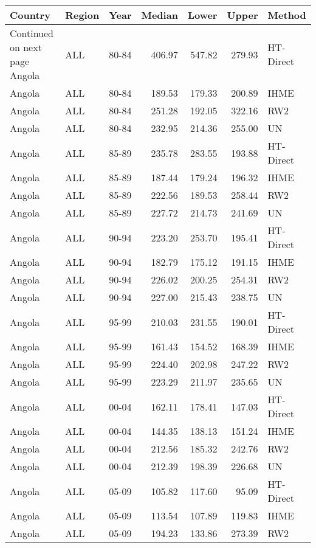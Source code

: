 \begin{longtable}{lllrrrl}
  \hline
Country & Region & Year & Median & Lower & Upper & Method \\ 
  \hline 
\endhead 
\hline 
{\footnotesize Continued on next page} 
\endfoot 
\endlastfoot 
Angola & ALL & 80-84 & 406.97 & 547.82 & 279.93 & HT-Direct \\ 
  Angola & ALL & 80-84 & 189.53 & 179.33 & 200.89 & IHME \\ 
  Angola & ALL & 80-84 & 251.28 & 192.05 & 322.16 & RW2 \\ 
  Angola & ALL & 80-84 & 232.95 & 214.36 & 255.00 & UN \\ 
  Angola & ALL & 85-89 & 235.78 & 283.55 & 193.88 & HT-Direct \\ 
  Angola & ALL & 85-89 & 187.44 & 179.24 & 196.32 & IHME \\ 
  Angola & ALL & 85-89 & 222.56 & 189.53 & 258.44 & RW2 \\ 
  Angola & ALL & 85-89 & 227.72 & 214.73 & 241.69 & UN \\ 
  Angola & ALL & 90-94 & 223.20 & 253.70 & 195.41 & HT-Direct \\ 
  Angola & ALL & 90-94 & 182.79 & 175.12 & 191.15 & IHME \\ 
  Angola & ALL & 90-94 & 226.02 & 200.25 & 254.31 & RW2 \\ 
  Angola & ALL & 90-94 & 227.00 & 215.43 & 238.75 & UN \\ 
  Angola & ALL & 95-99 & 210.03 & 231.55 & 190.01 & HT-Direct \\ 
  Angola & ALL & 95-99 & 161.43 & 154.52 & 168.39 & IHME \\ 
  Angola & ALL & 95-99 & 224.40 & 202.98 & 247.22 & RW2 \\ 
  Angola & ALL & 95-99 & 223.29 & 211.97 & 235.65 & UN \\ 
  Angola & ALL & 00-04 & 162.11 & 178.41 & 147.03 & HT-Direct \\ 
  Angola & ALL & 00-04 & 144.35 & 138.13 & 151.24 & IHME \\ 
  Angola & ALL & 00-04 & 212.56 & 185.32 & 242.76 & RW2 \\ 
  Angola & ALL & 00-04 & 212.39 & 198.39 & 226.68 & UN \\ 
  Angola & ALL & 05-09 & 105.82 & 117.60 & 95.09 & HT-Direct \\ 
  Angola & ALL & 05-09 & 113.54 & 107.89 & 119.83 & IHME \\ 
  Angola & ALL & 05-09 & 194.23 & 133.86 & 273.39 & RW2 \\ 

\end{longtable}
